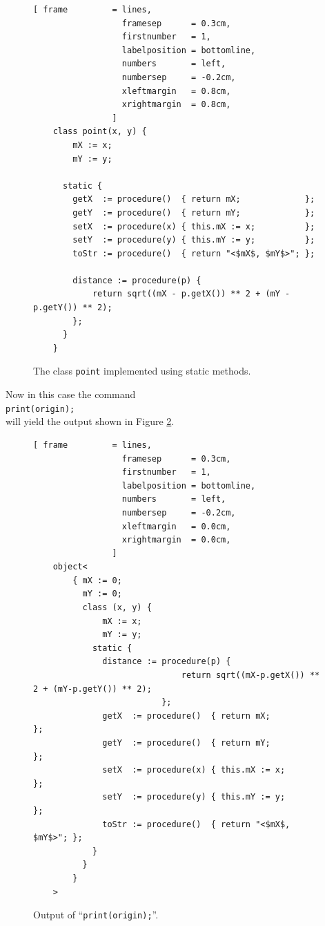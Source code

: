 \documentclass[11pt]{report}
\begin{document}
\begin{figure}[!htb]
\centering
\begin{Verbatim}[ frame         = lines, 
                  framesep      = 0.3cm, 
                  firstnumber   = 1,
                  labelposition = bottomline,
                  numbers       = left,
                  numbersep     = -0.2cm,
                  xleftmargin   = 0.8cm,
                  xrightmargin  = 0.8cm,
                ]
    class point(x, y) {
        mX := x;
        mY := y;
    
      static {
        getX  := procedure()  { return mX;             };
        getY  := procedure()  { return mY;             };
        setX  := procedure(x) { this.mX := x;          };
        setY  := procedure(y) { this.mY := y;          };
        toStr := procedure()  { return "<$mX$, $mY$>"; };
 
        distance := procedure(p) {
            return sqrt((mX - p.getX()) ** 2 + (mY - p.getY()) ** 2);
        };
      }
    }
\end{Verbatim}
\vspace*{-0.3cm}
\caption{The class \texttt{point} implemented using static methods.}
\label{fig:point-static.stlx}
\end{figure}

Now in this case the command 
\\[0.2cm]
\hspace*{1.3cm}
\texttt{print(origin);}
\\[0.2cm]
will yield the output shown in Figure \ref{fig:point-static.stlx-origin}.

\begin{figure}[!ht]
\centering
\begin{Verbatim}[ frame         = lines, 
                  framesep      = 0.3cm, 
                  firstnumber   = 1,
                  labelposition = bottomline,
                  numbers       = left,
                  numbersep     = -0.2cm,
                  xleftmargin   = 0.0cm,
                  xrightmargin  = 0.0cm,
                ]
    object<
        { mX := 0; 
          mY := 0; 
          class (x, y) { 
              mX := x; 
              mY := y; 
            static { 
              distance := procedure(p) { 
                              return sqrt((mX-p.getX()) ** 2 + (mY-p.getY()) ** 2); 
                          }; 
              getX  := procedure()  { return mX;             }; 
              getY  := procedure()  { return mY;             }; 
              setX  := procedure(x) { this.mX := x;          }; 
              setY  := procedure(y) { this.mY := y;          }; 
              toStr := procedure()  { return "<$mX$, $mY$>"; }; 
            } 
          } 
        }
    >
\end{Verbatim}
\vspace*{-0.3cm}
\caption{Output of ``\texttt{print(origin);}''.}
\label{fig:point-static.stlx-origin}
\end{figure}
\end{document}
